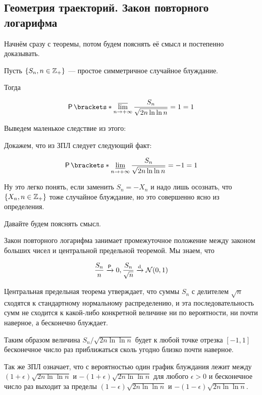 \subsection{Геометрия траекторий. Закон повторного логарифма}

Начнём сразу с теоремы, потом будем пояснять её смысл и постепенно доказывать.

\begin{theorem}
  Пусть $\{S_n, n \in \mathbb{Z}_+\}$ --- простое симметричное случайное блуждание.

  Тогда 

  \[
    \Pr{\varlimsup\limits_{n \to +\infty} \frac{S_n}{\sqrt{2n\ln\ln n}} = 1} = 1
  \]
\end{theorem}

Выведем маленькое следствие из этого:

\begin{remark}
  Докажем, что из ЗПЛ следует следующий факт:

  \[
    \Pr{\varliminf\limits_{n \to +\infty} \frac{S_n}{\sqrt{2n\ln\ln n}} = -1} = 1
  \]

  Ну это легко понять, если заменить $S_n = -X_n$ и надо лишь осознать, что 
  $\{X_n, n \in \mathbb{Z}_+\}$
  тоже случайное блуждание, но это совершенно ясно из определения.
\end{remark}

Давайте будем пояснять смысл.

Закон повторного логарифма занимает промежуточное положение между законом 
больших чисел и центральной предельной теоремой. Мы знаем, что

\[
  \frac{S_n}{n} \prto 0, \frac{S_n}{\sqrt{n}} \dto \mathcal{N}(0, 1)
\]

Центральная предельная теорема утверждает, что суммы $S_{n}$ с делителем
$\sqrt{n}$ сходятся к стандартному нормальному распределению, и эта
последовательность сумм не сходится к какой-либо конкретной величине ни по
вероятности, ни почти наверное, а бесконечно блуждает.

Таким образом величина $S_{n}/{\sqrt{2n\ln \ln n}}$ будет
к любой точке отрезка $[-1, 1]$ бесконечное число раз приближаться
сколь угодно близко почти наверное.

Так же ЗПЛ означает, что с вероятностью один график блуждания лежит между 
$(1 + \epsilon){\sqrt{2n\ln \ln n}}$ и $-(1 + \epsilon){\sqrt{2n\ln \ln n}}$
для любого $\epsilon > 0$ и бесконечное число раз выходит за пределы
$(1 - \epsilon){\sqrt{2n\ln \ln n}}$ и $-(1 - \epsilon){\sqrt{2n\ln \ln n}}$.

